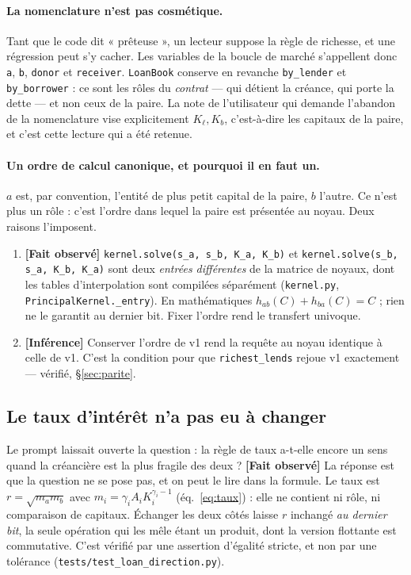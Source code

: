 \documentclass[11pt,a4paper]{article}
\newcommand{\code}[1]{\texttt{#1}}
\newcommand{\fait}{\textbf{[Fait observé]}}
\newcommand{\inference}{\textbf{[Inférence]}}
\begin{document}
\paragraph{La nomenclature n'est pas cosmétique.} Tant que le code dit
« prêteuse », un lecteur suppose la règle de richesse, et une régression peut
s'y cacher. Les variables de la boucle de marché s'appellent donc \code{a},
\code{b}, \code{donor} et \code{receiver}. \code{LoanBook} conserve en revanche
\code{by\_lender} et \code{by\_borrower} : ce sont les rôles du \emph{contrat}
--- qui détient la créance, qui porte la dette --- et non ceux de la paire. La
note de l'utilisateur qui demande l'abandon de la nomenclature vise
explicitement $K_\ell, K_b$, c'est-à-dire les capitaux de la paire, et c'est
cette lecture qui a été retenue.

\paragraph{Un ordre de calcul canonique, et pourquoi il en faut un.} $a$ est,
par convention, l'entité de plus petit capital de la paire, $b$ l'autre. Ce
n'est plus un rôle : c'est l'ordre dans lequel la paire est présentée au noyau.
Deux raisons l'imposent.

\begin{enumerate}
\item \fait{} \code{kernel.solve(s\_a, s\_b, K\_a, K\_b)} et
  \code{kernel.solve(s\_b, s\_a, K\_b, K\_a)} sont deux \emph{entrées différentes}
  de la matrice de noyaux, dont les tables d'interpolation sont compilées
  séparément (\code{kernel.py}, \code{PrincipalKernel.\_entry}). En
  mathématiques $h_{ab}(C) + h_{ba}(C) = C$ ; rien ne le garantit au dernier
  bit. Fixer l'ordre rend le transfert univoque.
\item \inference{} Conserver l'ordre de v1 rend la requête au noyau identique à
  celle de v1. C'est la condition pour que \code{richest\_lends} rejoue v1
  exactement --- vérifié, §\ref{sec:parite}.
\end{enumerate}

\subsection{Le taux d'intérêt n'a pas eu à changer}
\label{sec:taux}

Le prompt laissait ouverte la question : la règle de taux a-t-elle encore un
sens quand la créancière est la plus fragile des deux ? \fait{} La réponse est
que la question ne se pose pas, et on peut le lire dans la formule. Le taux est
$r = \sqrt{m_a m_b}$ avec $m_i = \gamma_i A_i K_i^{\gamma_i-1}$
(éq.~\ref{eq:taux}) : elle ne contient ni rôle, ni comparaison de capitaux.
Échanger les deux côtés laisse $r$ inchangé \emph{au dernier bit}, la seule
opération qui les mêle étant un produit, dont la version flottante est
commutative. C'est vérifié par une assertion d'égalité stricte, et non par une
tolérance (\code{tests/test\_loan\_direction.py}).
\end{document}
